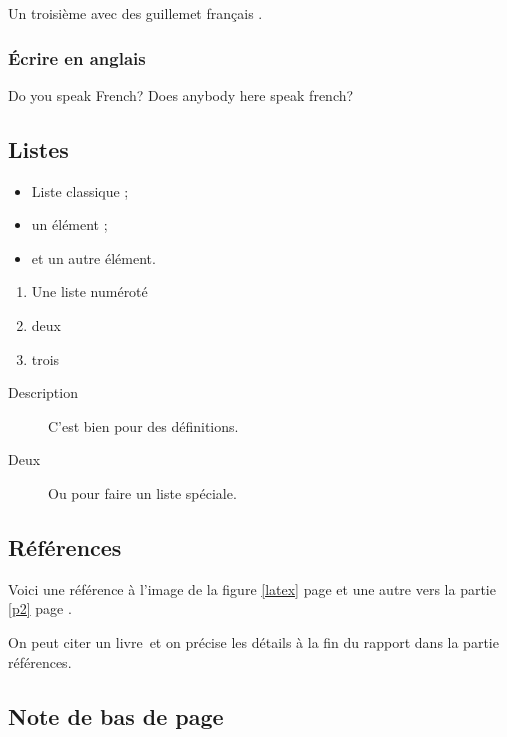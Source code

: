 Un troisième avec des \og guillemet français \fg{}.


%
\subsubsection{Écrire en anglais}

\foreignlanguage{english}{Do you speak French? Does anybody here speak french?}


%
\subsection{Listes}

\begin{itemize}
\item Liste classique ;
\item un élément ;
\item et un autre élément.
\end{itemize}
\vspace{\parskip} %

\begin{enumerate}
\item Une liste numéroté
\item deux
\item trois
\end{enumerate}
\vspace{\parskip}

\begin{description}
\item[Description] C'est bien pour des définitions.
\item[Deux] Ou pour faire un liste spéciale.
\end{description}
\vspace{\parskip}


%
\subsection{Références}

Voici une référence à l'image de la figure \ref{latex} page \pageref{latex} et une autre vers la partie \ref{p2} page \pageref{p2}.

On peut citer un livre\, et on précise les détails à la fin du rapport dans la partie références.


%
\subsection{Note de bas de page}


